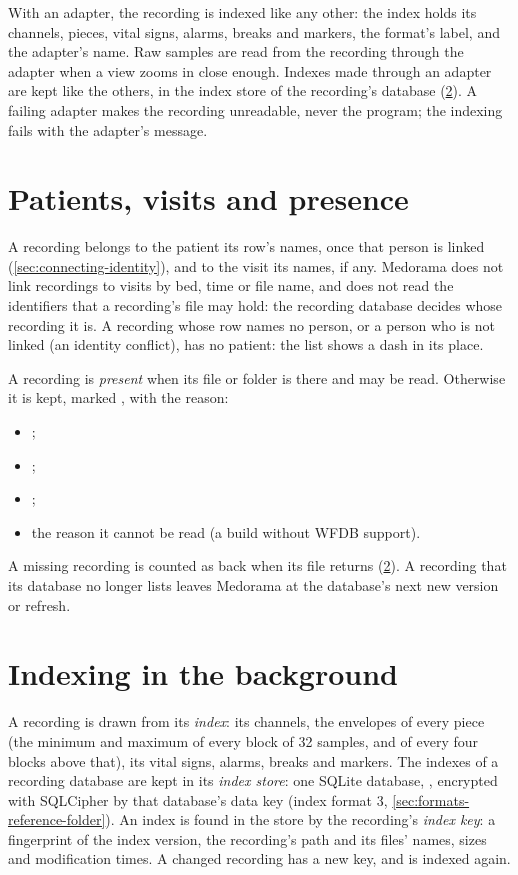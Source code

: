 With an adapter, the recording is indexed like any other: the index holds its channels, pieces,
vital signs, alarms, breaks and markers, the format's label, and the adapter's name. Raw samples
are read from the recording through the adapter when a view zooms in close enough. Indexes made
through an adapter are kept like the others, in the index store of the recording's database
(\cref{sec:recordings-indexing}). A failing adapter makes the recording unreadable, never the program; the
indexing fails with the adapter's message.

\section{Patients, visits and presence}
\label{sec:recordings-presence}
\label{sec:recordings-linking}

A recording belongs to the patient its row's  names, once that person is linked
(\cref{sec:connecting-identity}), and to the visit its  names, if any. Medorama
does not link recordings to visits by bed, time or file name, and does not read the identifiers
that a recording's file may hold: the recording database decides whose recording it is. A
recording whose row names no person, or a person who is not linked (an identity conflict), has no
patient: the  list shows a dash in its place.

A recording is \emph{present} when its file or folder is there and may be read. Otherwise it is
kept, marked , with the reason:
\begin{itemize}
\item {};
\item {};
\item {};
\item the reason it cannot be read (a build without WFDB support).
\end{itemize}
A missing recording is counted as back when its file returns (\cref{sec:recordings-indexing}). A
recording that its database no longer lists leaves Medorama at the database's next new version or
refresh.

\section{Indexing in the background}
\label{sec:recordings-indexing}

A recording is drawn from its \emph{index}: its channels, the envelopes of every piece (the
minimum and maximum of every block of 32 samples, and of every four blocks above that), its vital
signs, alarms, breaks and markers. The indexes of a recording database are kept in its
\emph{index store}: one SQLite database, , encrypted with
SQLCipher by that database's data key (index format 3, \cref{sec:formats-reference-folder}). An index is
found in the store by the recording's \emph{index key}: a fingerprint of the index version, the
recording's path and its files' names, sizes and modification times. A changed recording has a
new key, and is indexed again.

